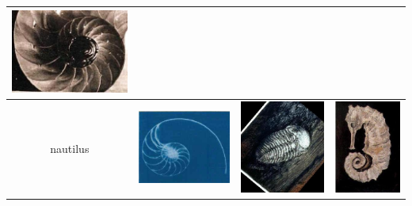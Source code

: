 \documentclass{article}
\begin{document}
\begin{table}[Ht]
\begin{tabular}{| c | c | c | c |}
\vspace{0cm}\includegraphics[scale=.1]{"Figures/False Matches/class_1_least_sure_wrong"} \\
\hline
nautilus &
\vspace{0cm}\includegraphics[scale=.1]{"Figures/Best Matches/bestmatch_c2"} &
\vspace{0cm}\includegraphics[scale=.1]{"Figures/False Matches/class_2_most_sure_wrong"} &
\vspace{0cm}\includegraphics[scale=.1]{"Figures/False Matches/class_2_least_sure_wrong"} \\

\end{tabular}
\end{table}
\end{document}
